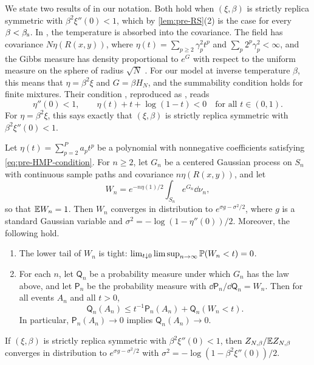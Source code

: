 We state two results of \cite{HuangMontanariPham2024} in our notation. Both hold when $(\xi,\beta)$ is strictly replica symmetric with $\beta^2\xi''(0)<1$, which by \cref{lem:pre-RS}(2) is the case for every $\beta<\beta_{\mathrm s}$. In \cite{HuangMontanariPham2024}, the temperature is absorbed into the covariance. The field has covariance $N\eta(R(x,y))$, where $\eta(t)=\sum_{p\ge2}\gamma_p^2t^p$ and $\sum_p2^p\gamma_p^2<\infty$, and the Gibbs measure has density proportional to $e^{G}$ with respect to the uniform measure on the sphere of radius $\sqrt N$ \cite[(1.1)--(1.2)]{HuangMontanariPham2024}. For our model at inverse temperature $\beta$, this means that $\eta=\beta^2\xi$ and $G=\beta H_N$, and the summability condition holds for finite mixtures. Their condition \cite[(2.21)]{HuangMontanariPham2024}, reproduced as \cite[(7.9)]{HuangMontanariPham2024}, reads
\begin{equation}\label{eq:pre-HMP-condition}
\eta''(0)<1,\qquad \eta(t)+t+\log(1-t)<0\quad\text{for all }t\in(0,1).
\end{equation}
For $\eta=\beta^2\xi$, this says exactly that $(\xi,\beta)$ is strictly replica symmetric with $\beta^2\xi''(0)<1$.

\begin{lemma}\label{lem:pre-HMP-Z}
Let $\eta(t)=\sum_{p=2}^Pa_pt^p$ be a polynomial with nonnegative coefficients satisfying \eqref{eq:pre-HMP-condition}. For $n\ge2$, let $G_n$ be a centered Gaussian process on $S_n$ with continuous sample paths and covariance $n\eta(R(x,y))$, and let
\[
W_n=e^{-n\eta(1)/2}\int_{S_n}e^{G_n}\dd\nu_n,
\]
so that $\mathbb E W_n=1$. Then $W_n$ converges in distribution to $e^{\sigma g-\sigma^2/2}$, where $g$ is a standard Gaussian variable and $\sigma^2=-\log(1-\eta''(0))/2$. Moreover, the following hold.
\begin{enumerate}
\item The lower tail of $W_n$ is tight: $\lim_{t\downarrow0}\limsup_{n\to\infty}\mathbb P(W_n<t)=0$.
\item For each $n$, let $\mathsf Q_n$ be a probability measure under which $G_n$ has the law above, and let $\mathsf P_n$ be the probability measure with $\dd\mathsf P_n/\dd\mathsf Q_n=W_n$. Then for all events $A_n$ and all $t>0$,
\[
\mathsf Q_n(A_n)\le t^{-1}\mathsf P_n(A_n)+\mathsf Q_n(W_n<t).
\]
In particular, $\mathsf P_n(A_n)\to0$ implies $\mathsf Q_n(A_n)\to0$.
\end{enumerate}
If $(\xi,\beta)$ is strictly replica symmetric with $\beta^2\xi''(0)<1$, then $Z_{N,\beta}/\mathbb E Z_{N,\beta}$ converges in distribution to $e^{\sigma g-\sigma^2/2}$ with $\sigma^2=-\log(1-\beta^2\xi''(0))/2$.
\end{lemma}

